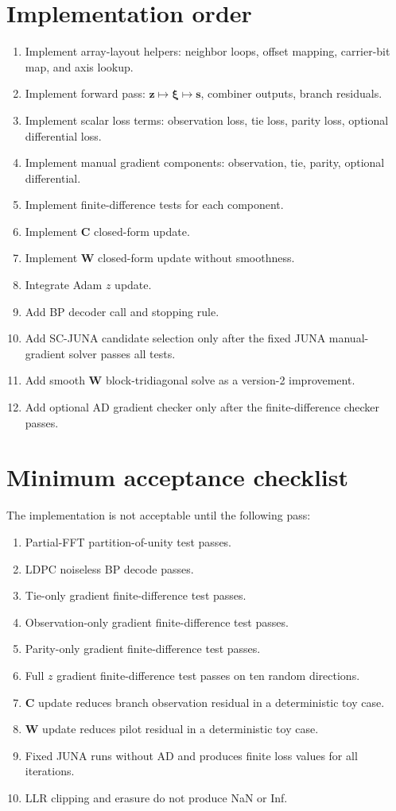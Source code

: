 \documentclass[11pt]{article}
\begin{document}
\section{Implementation order}

\begin{enumerate}[label=\textbf{Step \arabic*.},leftmargin=*]
\item Implement array-layout helpers: neighbor loops, offset mapping, carrier-bit map, and axis lookup.
\item Implement forward pass: $\bm z\mapsto\bm\xi\mapsto\mathbf s$, combiner outputs, branch residuals.
\item Implement scalar loss terms: observation loss, tie loss, parity loss, optional differential loss.
\item Implement manual gradient components: observation, tie, parity, optional differential.
\item Implement finite-difference tests for each component.
\item Implement $\mathbf C$ closed-form update.
\item Implement $\mathbf W$ closed-form update without smoothness.
\item Integrate Adam $z$ update.
\item Add BP decoder call and stopping rule.
\item Add SC-JUNA candidate selection only after the fixed JUNA manual-gradient solver passes all tests.
\item Add smooth $\mathbf W$ block-tridiagonal solve as a version-2 improvement.
\item Add optional AD gradient checker only after the finite-difference checker passes.
\end{enumerate}

\section{Minimum acceptance checklist}

The implementation is not acceptable until the following pass:
\begin{enumerate}[leftmargin=*]
\item Partial-FFT partition-of-unity test passes.
\item LDPC noiseless BP decode passes.
\item Tie-only gradient finite-difference test passes.
\item Observation-only gradient finite-difference test passes.
\item Parity-only gradient finite-difference test passes.
\item Full $z$ gradient finite-difference test passes on ten random directions.
\item $\mathbf C$ update reduces branch observation residual in a deterministic toy case.
\item $\mathbf W$ update reduces pilot residual in a deterministic toy case.
\item Fixed JUNA runs without AD and produces finite loss values for all iterations.
\item LLR clipping and erasure do not produce NaN or Inf.
\end{enumerate}
\end{document}
